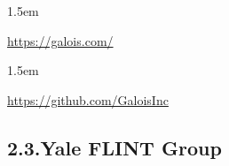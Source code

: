 \documentclass[12pt,twoside]{article}
\begin{document}
\begin{mddefinitions}%


\begin{mdbmarginx}{}{}{}{1.5em}%
\begin{mddefdata}%
\href{https://galois.com/}{{\ttfamily https://\hspace{0pt}galois.\hspace{0pt}com/\hspace{0pt}}}
\end{mddefdata}%
\end{mdbmarginx}%


\begin{mdbmarginx}{}{}{}{1.5em}%
\begin{mddefdata}%
\href{https://github.com/GaloisInc}{{\ttfamily https://\hspace{0pt}github.\hspace{0pt}com/\hspace{0pt}GaloisInc}}%
\end{mddefdata}%
\end{mdbmarginx}%
\end{mddefinitions}%

\subsection{2.3.\hspace*{0.5em}Yale FLINT Group}\label{sec-yale-flint-group}%
\end{document}
